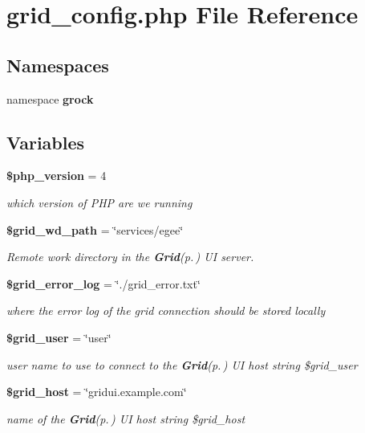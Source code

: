 \section{grid\_\-config.php File Reference}
\label{test_2grid__config_8php}
\subsection*{Namespaces}
\begin{CompactItemize}
\item 
namespace {\bf grock}
\end{CompactItemize}
\subsection*{Variables}
\begin{CompactItemize}
\item 
{\bf \$php\_\-version} = 4
\begin{CompactList}\small\item\em which version of PHP are we running \item\end{CompactList}\item 
{\bf \$grid\_\-wd\_\-path} = \char`\"{}services/egee\char`\"{}
\begin{CompactList}\small\item\em Remote work directory in the {\bf Grid}{\rm (p.\,\pageref{classGrid})} UI server. \item\end{CompactList}\item 
{\bf \$grid\_\-error\_\-log} = \char`\"{}./grid\_\-error.txt\char`\"{}
\begin{CompactList}\small\item\em where the error log of the grid connection should be stored locally \item\end{CompactList}\item 
{\bf \$grid\_\-user} = \char`\"{}user\char`\"{}
\begin{CompactList}\small\item\em user name to use to connect to the {\bf Grid}{\rm (p.\,\pageref{classGrid})} UI host  string \$grid\_\-user \item\end{CompactList}\item 
{\bf \$grid\_\-host} = \char`\"{}gridui.example.com\char`\"{}
\begin{CompactList}\small\item\em name of the {\bf Grid}{\rm (p.\,\pageref{classGrid})} UI host  string \$grid\_\-host \item\end{CompactList}\item 

\end{CompactItemize}
